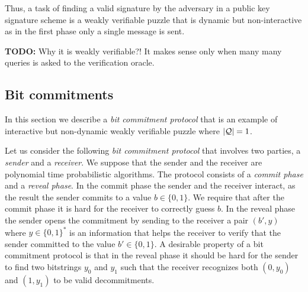 Thus, a task of finding a valid signature by the adversary in a public key signature scheme is a weakly verifiable puzzle that
is dynamic but non-interactive as in the first phase only a single message is sent.
\begin{todo}
  \textbf{TODO:} Why it is weakly verifiable?! It makes sense only when many many queries is asked to the verification oracle.
\end{todo}

\subsection{Bit commitments}
In this section we describe a \textit{bit commitment protocol} that is an example of interactive but non-dynamic weakly verifiable puzzle where $|\mathcal{Q}| = 1$.

Let us consider the following \textit{bit commitment protocol} that involves two parties, a \textit{sender} and a \textit{receiver}.
We suppose that the sender and the receiver are polynomial time probabilistic algorithms.
The protocol consists of a \textit{commit phase} and a \textit{reveal phase}.
In the commit phase the sender and the receiver interact, as the result the sender commits to a value $b \in \{0,1\}$.
We require that after the commit phase it is hard for the receiver to correctly guess $b$.
In the reveal phase the sender opens the commitment by sending to the receiver a pair $(b', y)$ where $y \in \{0,1\}^{*}$ is an information
that helps the receiver to verify that the sender committed to the value $b' \in \{0,1\}$.
A desirable property of a bit commitment protocol is that in the reveal phase it
should be hard for the sender to find two bitstrings $y_0$ and $y_1$ such that
the receiver recognizes both $(0,y_0)$ and $(1, y_1)$ to be valid decommitments.

